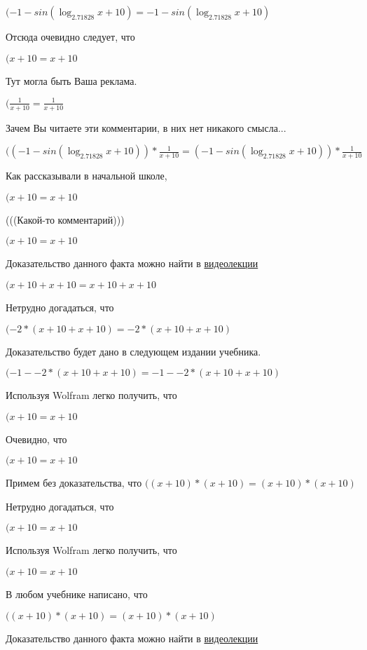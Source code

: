 \documentclass[12pt,a4paper,fleqn]{article}
\theoremstyle{definition}
\begin{document}
$( -1  - sin(\log_{ 2.71828 }{ x  +  10 }) =  -1  - sin(\log_{ 2.71828 }{ x  +  10 })$

Отсюда очевидно следует, что

$( x  +  10  =  x  +  10 $

Тут могла быть Ваша реклама.

$(\frac{ 1 }{ x  +  10 }
 = \frac{ 1 }{ x  +  10 }
$

Зачем Вы читаете эти комментарии, в них нет никакого смысла...

$(( -1  - sin(\log_{ 2.71828 }{ x  +  10 })) * \frac{ 1 }{ x  +  10 }
 = ( -1  - sin(\log_{ 2.71828 }{ x  +  10 })) * \frac{ 1 }{ x  +  10 }
$

Как рассказывали в начальной школе,

$( x  +  10  =  x  +  10 $

(((Какой-то комментарий)))

$( x  +  10  =  x  +  10 $

Доказательство данного факта можно найти в \href{https://www.youtube.com/watch?v=dQw4w9WgXcQ}{видеолекции}

$( x  +  10  +  x  +  10  =  x  +  10  +  x  +  10 $

Нетрудно догадаться, что

$( -2  * ( x  +  10  +  x  +  10 ) =  -2  * ( x  +  10  +  x  +  10 )$

Доказательство будет дано в следующем издании учебника.

$( -1  -  -2  * ( x  +  10  +  x  +  10 ) =  -1  -  -2  * ( x  +  10  +  x  +  10 )$

Используя Wolfram легко получить, что

$( x  +  10  =  x  +  10 $

Очевидно, что

$( x  +  10  =  x  +  10 $

Примем без доказательства, что
$(( x  +  10 ) * ( x  +  10 ) = ( x  +  10 ) * ( x  +  10 )$

Нетрудно догадаться, что

$( x  +  10  =  x  +  10 $

Используя Wolfram легко получить, что

$( x  +  10  =  x  +  10 $

В любом учебнике написано, что

$(( x  +  10 ) * ( x  +  10 ) = ( x  +  10 ) * ( x  +  10 )$

Доказательство данного факта можно найти в \href{https://www.youtube.com/watch?v=dQw4w9WgXcQ}{видеолекции}
\end{document}
